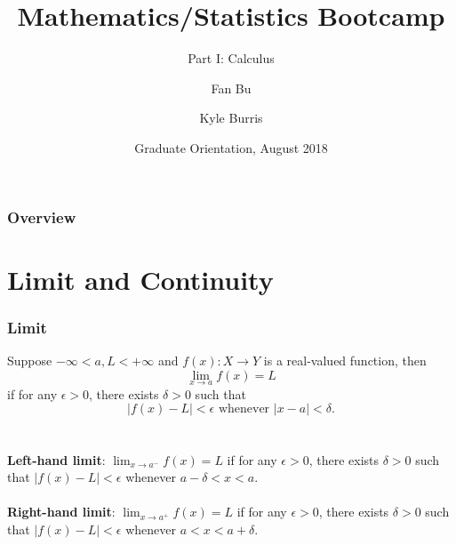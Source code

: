 \documentclass{beamer}
\title[Calculus]{Mathematics/Statistics Bootcamp} %
\subtitle{Part I: Calculus}
\author{Fan Bu\inst{1} \and Kyle Burris\inst{1}}
\institute[Duke University] %
{
  \inst{1}%
  Department of Statistical Science\\
  Duke University
  }
\date{Graduate Orientation, August 2018}
\begin{document}
\begin{frame}
\titlepage %
\end{frame}

\begin{frame}
\frametitle{Overview} %
\tableofcontents %
\end{frame}


\section{Limit and Continuity} %


\begin{frame}
\frametitle{Limit}
Suppose $-\infty < a,L < +\infty$ and $f(x): X \rightarrow Y$ is a real-valued function, then 
$$
\lim_{x\rightarrow a}f(x) = L
$$
if for any $\epsilon > 0$, there exists $\delta > 0$ such that \\
$$
\vert f(x)-L \vert < \epsilon \text{ whenever } 
\vert x-a \vert < \delta.
$$
\\~\\
\textbf{Left-hand limit}:
$\lim_{x\rightarrow a^{-}}f(x) = L$ if for any $\epsilon > 0$, there exists $\delta > 0$ such that
$\vert f(x)-L \vert < \epsilon$ whenever
$ a-\delta < x < a$.
\\~\\
\textbf{Right-hand limit}:
$\lim_{x\rightarrow a^{+}}f(x) = L$ if for any $\epsilon > 0$, there exists $\delta > 0$ such that
$\vert f(x)-L \vert < \epsilon$ whenever
$ a < x < a+\delta$.

\end{frame}
\end{document}
